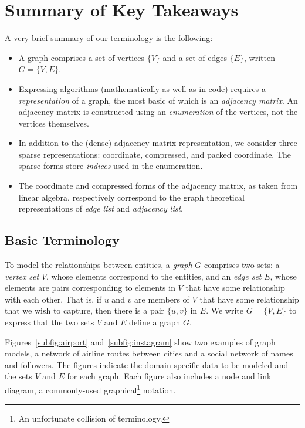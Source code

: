 \section{Summary of Key Takeaways}
A very brief summary of our terminology is the following:
\begin{itemize}
  \item A graph comprises a set of vertices $\{V\}$ and a set of edges $\{E\}$, written $G=\{V, E\}$.
  \item Expressing algorithms (mathematically as well as in code) requires a \emph{representation} of a graph, the most basic of which is an \emph{adjacency matrix}.  An adjacency matrix is constructed using an \emph{enumeration} of the vertices, not the vertices themselves.
    \item In addition to the (dense) adjacency matrix representation, we consider three sparse representations: coordinate, compressed, and packed coordinate.  The sparse forms store \emph{indices} used in the enumeration.
    \item The coordinate and compressed forms of the adjacency matrix, as taken from linear algebra, respectively correspond to the graph theoretical representations of \emph{edge list} and \emph{adjacency list}.
\end{itemize}


\subsection{Basic Terminology}

To model the relationships between entities, a \emph{graph} $G$ comprises two sets:
a \emph{vertex set} $V$, whose elements correspond to the entities, and an \emph{edge set} $E$, whose
elements are pairs corresponding to elements in $V$ that have some relationship with each other.  That is,
if $u$ and $v$ are members of $V$ that have some relationship that we wish to capture, then there is
a pair $\{u, v\}$ in $E$.  We write $G=\{V, E\}$ to express that the two sets $V$ and $E$ define a graph $G$.

Figures~\ref{subfig:airport} and~\ref{subfig:instagram} show two examples of graph models,
a network of airline routes between cities and a social network of names and followers.
The figures indicate the domain-specific data to be modeled and the sets $V$ and $E$ for each graph.
Each figure also includes a node and link diagram, a commonly-used graphical\footnote{An unfortunate collision of terminology.}
notation.

